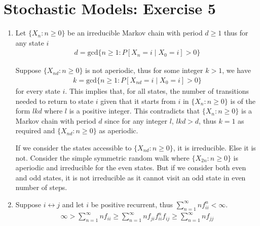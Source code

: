 \documentclass[a4paper,10pt]{article}
\theoremstyle{definition}
\begin{document}
\section*{Stochastic Models: Exercise 5}

\begin{enumerate}
\item Let $\{X_n: n\geq 0\}$ be an irreducible Markov chain with period $d \geq 1$ thus for any state $i$
\begin{align*}
d=\text{gcd}\{n\geq 1: P\left[X_n=i\mid X_0=i\right]>0\}
\end{align*}


Suppose $\{X_{nd}:n\geq 0\}$ is not aperiodic, thus for some integer $k>1$, we have
\begin{align*}  
k=\text{gcd}\{n\geq 1: P\left[X_{nd}=i\mid X_0=i\right]>0\}
\end{align*}
for every state $i$. This implies that, for all states, the number of transitions needed to return to state $i$ given that it starts from $i$ in $\{X_n: n\geq 0\}$ is of the form $lkd$ where $l$ is a positive integer. This contradicts that $\{X_n: n\geq 0\}$ is a Markov chain with period $d$ since for any integer $l$, $lkd>d$, thus $k=1$ as required and $\{X_{nd}: n\geq 0\}$ as aperiodic.

If we consider the states accessible to $\{X_{nd}: n\geq 0\}$, it is irreducible. Else it is not. Consider the simple symmetric random walk where $\{X_{2n}: n\geq 0\}$ is aperiodic and irreducible for the even states. But if we consider both even and odd states, it is not irreducible as it cannot visit an odd state in even number of steps.

\item Suppose $i \leftrightarrow j$ and let $i$ be positive recurrent, thus $\sum_{n=1}^{\infty}nf_{ii}^n<\infty$. 
\begin{align*}
\infty >\sum_{n=1}^{\infty}nf_{ii}\geq \sum_{n=1}^{\infty}nf_{ji}f_{ii}^nf_{ij}\geq \sum_{n=1}^{\infty}nf_{jj}
\end{align*}



\end{enumerate}
\end{document}
